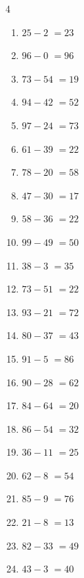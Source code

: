\begin{multicols}{4}
\begin{enumerate}
  \item $25-2$
        $=23$

  \item $96-0$
        $=96$

  \item $73-54$
        $=19$

  \item $94-42$
        $=52$

  \item $97-24$
        $=73$

  \item $61-39$
        $=22$

  \item $78-20$
        $=58$

  \item $47-30$
        $=17$

  \item $58-36$
        $=22$

  \item $99-49$
        $=50$

  \item $38-3$
        $=35$

  \item $73-51$
        $=22$

  \item $93-21$
        $=72$

  \item $80-37$
        $=43$

  \item $91-5$
        $=86$

  \item $90-28$
        $=62$

  \item $84-64$
        $=20$

  \item $86-54$
        $=32$

  \item $36-11$
        $=25$

  \item $62-8$
        $=54$

  \item $85-9$
        $=76$

  \item $21-8$
        $=13$

  \item $82-33$
        $=49$

  \item $43-3$
        $=40$


\end{enumerate}
\end{multicols}
